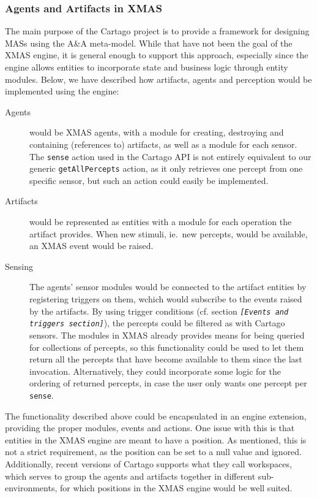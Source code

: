 \subsubsection*{Agents and Artifacts in XMAS}

The main purpose of the Cartago project is to provide a framework
for designing MASs using the A\&A meta-model. While that have not
been the goal of the XMAS engine, it is general enough to support
this approach, especially since the engine allows entities to incorporate
state and business logic through entity modules. Below, we have described
how artifacts, agents and perception would be implemented using the
engine:
\begin{description}
\item [{Agents}] would be XMAS agents, with a module for creating, destroying
and containing (references to) artifacts, as well as a module for
each sensor. The \texttt{sense} action used in the Cartago API is
not entirely equivalent to our generic \texttt{getAllPercepts} action,
as it only retrieves one percept from one specific sensor, but such
an action could easily be implemented. 
\item [{Artifacts}] would be represented as entities with a module for
each operation the artifact provides. When new stimuli, ie.\ new
percepts, would be available, an XMAS event would be raised.
\item [{Sensing}] The agents' sensor modules would be connected to the
artifact entities by registering triggers on them, wchich would subscribe
to the events raised by the artifacts. By using trigger conditions
(cf. section \texttt{\emph{{[}Events and triggers section{]}}}), the
percepts could be filtered as with Cartago sensors. The modules in
XMAS already provides means for being queried for collections of percepts,
so this functionality could be used to let them return all the percepts
that have become available to them since the last invocation. Alternatively,
they could incorporate some logic for the ordering of returned percepts,
in case the user only wants one percept per \texttt{sense}.
\end{description}
The functionality described above could be encapsulated in an engine
extension, providing the proper modules, events and actions. One issue
with this is that entities in the XMAS engine are meant to have a
position. As mentioned, this is not a strict requirement, as the position
can be set to a null value and ignored. Additionally, recent versions
of Cartago supports what they call workspaces, which serves to group
the agents and artifacts together in different sub-environments, for
which positions in the XMAS engine would be well suited.


